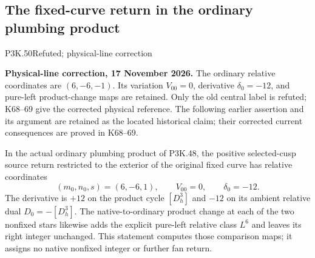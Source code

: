 \subsection{The fixed-curve return in the ordinary plumbing product}
\begin{statement}{P3K.50}{Refuted; physical-line correction}\par\noindent\textbf{Physical-line correction, 17 November 2026.} The ordinary relative coordinates are \((6,-6,-1)\). Its variation \(V_{00}=0\), derivative \(\delta_0=-12\), and pure-left product-change maps are retained. Only the old central label is refuted; K68--69 give the corrected physical reference. The following earlier assertion and its argument are retained as the located historical claim; their corrected current consequences are proved in K68--69.\medskip\par 
In the actual ordinary plumbing product of P3K.48, the positive
selected-cusp source return restricted to the exterior of the
original fixed curve has relative coordinates
\[
 (m_0,n_0,s)=(6,-6,1),\qquad V_{00}=0,\qquad\delta_0=-12.
\]
The derivative is \(+12\) on the product cycle \([D^3_h]\) and
\(-12\) on its ambient relative dual \(D_0=-[D^3_h]\).
The native-to-ordinary product change at each of the two nonfixed
stars likewise adds the explicit pure-left relative class \(L^6\)
and leaves its right integer unchanged. This statement computes
those comparison maps; it assigns no native nonfixed integer or
further fan return.
\end{statement}
